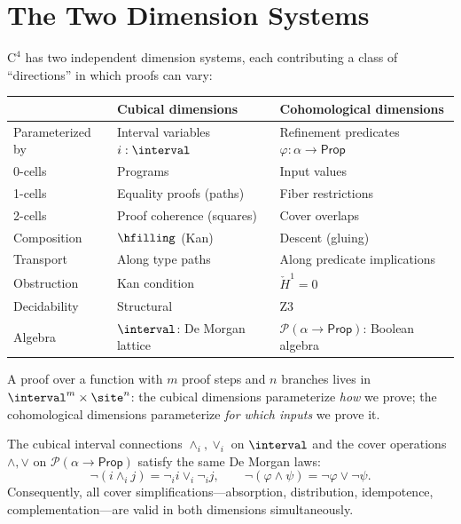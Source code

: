 \section{The Two Dimension Systems}
\label{sec:two-dimensions}

\begin{definition}
\label{def:two-dimensions}
\(\mathrm{C}^4\) has two independent dimension systems, each contributing
a class of ``directions'' in which proofs can vary:

\medskip
\begin{center}
\begin{tabular}{lll}
\toprule
& \textbf{Cubical dimensions} & \textbf{Cohomological dimensions} \\
\midrule
Parameterized by & Interval variables \(i : \interval\) &
  Refinement predicates \(\varphi : \alpha \to \mathsf{Prop}\) \\
0-cells & Programs & Input values \\
1-cells & Equality proofs (paths) & Fiber restrictions \\
2-cells & Proof coherence (squares) & Cover overlaps \\
Composition & \(\hfilling\) (Kan) & Descent (gluing) \\
Transport & Along type paths & Along predicate implications \\
Obstruction & Kan condition & \(\check{H}^1 = 0\) \\
Decidability & Structural & Z3 \\
Algebra & \(\interval\): De Morgan lattice &
  \(\mathcal{P}(\alpha \to \mathsf{Prop})\): Boolean algebra \\
\bottomrule
\end{tabular}
\end{center}
\end{definition}

A proof over a function with \(m\) proof steps and \(n\) branches
lives in \(\interval^m \times \site^n\): the cubical dimensions
parameterize \emph{how} we prove; the cohomological dimensions
parameterize \emph{for which inputs} we prove it.

\begin{theorem}
\label{thm:algebraic-synergy}
The cubical interval connections \(\wedge_i, \vee_i\) on \(\interval\)
and the cover operations \(\wedge, \vee\) on \(\mathcal{P}(\alpha \to \mathsf{Prop})\)
satisfy the same De Morgan laws:
\[
  \neg(i \wedge_i j) = \neg_i i \vee_i \neg_i j,
  \qquad
  \neg(\varphi \wedge \psi) = \neg\varphi \vee \neg\psi.
\]
Consequently, all cover simplifications---absorption, distribution,
idempotence, complementation---are valid in both dimensions
simultaneously.
\end{theorem}

